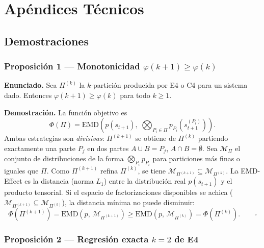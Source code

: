 
\section{Apéndices Técnicos}

\subsection{Demostraciones}

\subsubsection*{Proposición 1 — Monotonicidad $\varphi(k+1) \geq \varphi(k)$}

\textbf{Enunciado.} Sea $\Pi^{(k)}$ la $k$-partición producida por E4 o C4
para un sistema dado. Entonces $\varphi(k+1) \geq \varphi(k)$ para todo
$k \geq 1$.

\textbf{Demostración.}
La función objetivo es
\[
  \Phi(\Pi) = \mathrm{EMD}\!\left(p(s_{t+1}),\;
              \bigotimes_{P_i \in \Pi} p_{P_i}(s_{t+1}^{(P_i)})\right).
\]
Ambas estrategias son \emph{divisivas}: $\Pi^{(k+1)}$ se obtiene de
$\Pi^{(k)}$ partiendo exactamente una parte $P_j$ en dos partes
$A \cup B = P_j$, $A \cap B = \emptyset$.
Sea $\mathcal{M}_\Pi$ el conjunto de distribuciones de la forma
$\bigotimes_{P_i} p_{P_i}$ para particiones más finas o iguales que $\Pi$.
Como $\Pi^{(k+1)}$ refina $\Pi^{(k)}$, se tiene
$\mathcal{M}_{\Pi^{(k+1)}} \subseteq \mathcal{M}_{\Pi^{(k)}}$.
La EMD-Effect es la distancia (norma $L_1$) entre la distribución real
$p(s_{t+1})$ y el producto tensorial.
Si el espacio de factorizaciones disponibles se achica
($\mathcal{M}_{\Pi^{(k+1)}} \subseteq \mathcal{M}_{\Pi^{(k)}}$),
la distancia mínima no puede disminuir:
\[
  \Phi\!\left(\Pi^{(k+1)}\right)
    = \mathrm{EMD}\!\left(p,\, \mathcal{M}_{\Pi^{(k+1)}}\right)
    \geq \mathrm{EMD}\!\left(p,\, \mathcal{M}_{\Pi^{(k)}}\right)
    = \Phi\!\left(\Pi^{(k)}\right). \qquad \square
\]

\subsubsection*{Proposición 2 — Regresión exacta $k=2$ de E4}

